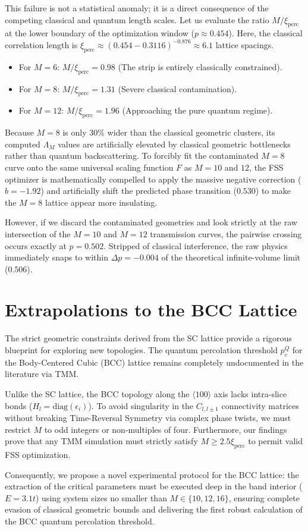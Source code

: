 \documentclass[11pt,a4paper]{article}
\begin{document}
This failure is not a statistical anomaly; it is a direct consequence of the competing classical and quantum length scales. Let us evaluate the ratio $M/\xi_{\text{perc}}$ at the lower boundary of the optimization window ($p \approx 0.454$). Here, the classical correlation length is $\xi_{\text{perc}} \approx (0.454 - 0.3116)^{-0.876} \approx 6.1$ lattice spacings.
\begin{itemize}
    \item For $M=6$: $M/\xi_{\text{perc}} = 0.98$ (The strip is entirely classically constrained).
    \item For $M=8$: $M/\xi_{\text{perc}} = 1.31$ (Severe classical contamination).
    \item For $M=12$: $M/\xi_{\text{perc}} = 1.96$ (Approaching the pure quantum regime).
\end{itemize}

Because $M=8$ is only $30\%$ wider than the classical geometric clusters, its computed $\Lambda_M$ values are artificially elevated by classical geometric bottlenecks rather than quantum backscattering. To forcibly fit the contaminated $M=8$ curve onto the same universal scaling function $F$ as $M=10$ and $12$, the FSS optimizer is mathematically compelled to apply the massive negative correction ($b=-1.92$) and artificially shift the predicted phase transition ($0.530$) to make the $M=8$ lattice appear more insulating.

However, if we discard the contaminated geometries and look strictly at the raw intersection of the $M=10$ and $M=12$ transmission curves, the pairwise crossing occurs exactly at $p = 0.502$. Stripped of classical interference, the raw physics immediately snaps to within $\Delta p = -0.004$ of the theoretical infinite-volume limit ($0.506$). 

\section{Extrapolations to the BCC Lattice}

The strict geometric constraints derived from the SC lattice provide a rigorous blueprint for exploring new topologies. The quantum percolation threshold $p_c^Q$ for the Body-Centered Cubic (BCC) lattice remains completely undocumented in the literature via TMM. 

Unlike the SC lattice, the BCC topology along the $\langle 100 \rangle$ axis lacks intra-slice bonds ($H_l = \text{diag}(\epsilon_i)$). To avoid singularity in the $C_{l, l\pm1}$ connectivity matrices without breaking Time-Reversal Symmetry via complex phase twists, we must restrict $M$ to odd integers or non-multiples of four. Furthermore, our findings prove that any TMM simulation must strictly satisfy $M \ge 2.5 \xi_{\text{perc}}$ to permit valid FSS optimization. 

Consequently, we propose a novel experimental protocol for the BCC lattice: the extraction of the critical parameters must be executed deep in the band interior ($E=3.1t$) using system sizes no smaller than $M \in \{10, 12, 16\}$, ensuring complete evasion of classical geometric bounds and delivering the first robust calculation of the BCC quantum percolation threshold.
\end{document}
